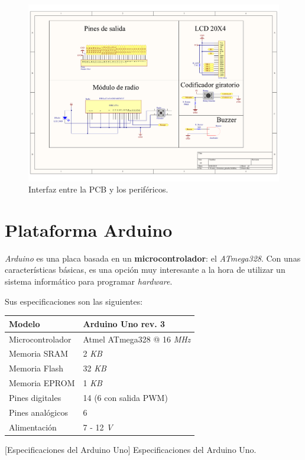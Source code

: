\begin{figure}[H]
	\noindent \begin{centering}
		\includegraphics[width=\linewidth*2/3]{capitulo3/pcb_perifericos}
		\par\end{centering}
	\smallskip
	\caption{\label{fig:pcb_perifericos} Interfaz entre la PCB y los periféricos.}
\end{figure} 

\smallskip

\section{Plataforma Arduino}

\textit{Arduino} es una placa basada en un \textbf{microcontrolador}: el \textit{ATmega328}. Con unas características básicas, es una opción muy interesante a la hora de utilizar un sistema informático para programar \textit{hardware}.

Sus especificaciones son las siguientes:

\smallskip

\begin{center}
	\begin{tabular}{|l|l|}
		\hline Modelo & Arduino Uno rev. 3 \\
		\hline Microcontrolador & Atmel ATmega328 @ 16 \textit{MHz}\\
		\hline Memoria SRAM & 2 \textit{KB} \\		
		\hline Memoria Flash & 32 \textit{KB} \\
		\hline Memoria EPROM & 1 \textit{KB} \\
		\hline Pines digitales & 14 (6 con salida \acrshort{PWM}) \\
		\hline Pines analógicos & 6 \\
		\hline Alimentación & 7 - 12 \textit{V} \\
		\hline 
	\end{tabular}
	\smallskip
	[Especificaciones del Arduino Uno]{\label{tab:rapberry} Especificaciones del Arduino Uno. \cite{arduino}}
	
\end{center}

